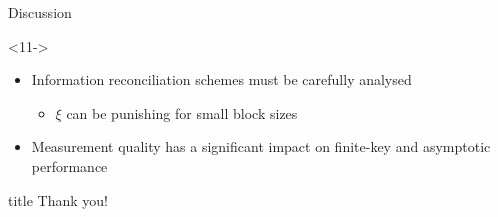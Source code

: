 \documentclass[xcolor=dvipsnames]{beamer}
\newcommand{\?}{\mathrel{?}} %
\begin{document}
\begin{frame}{Discussion}
\begin{onlyenv}
  \end{onlyenv}
  \begin{onlyenv}<11->
    \begin{itemize}[<+->]
      \item Information reconciliation schemes must be carefully analysed
        \begin{itemize}
          \item \(\xi\) can be punishing for small block sizes
        \end{itemize}
      \item Measurement quality has a significant impact on finite-key and asymptotic performance
    \end{itemize}
  \end{onlyenv}
\end{frame}

\begin{frame}[c]{}
  \begin{center}
    \begin{beamercolorbox}[sep=8pt,center,shadow=true,rounded=true]{title}
      Thank you!
    \end{beamercolorbox}
  \end{center}
\end{frame}

\end{document}
